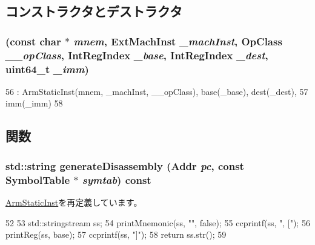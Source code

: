 \subsection{コンストラクタとデストラクタ}
\hypertarget{classArmISA_1_1SysDC64_a54b1b64752414185c38e74f5f42bd479}{
\subsubsection[{SysDC64}]{ (const char $\ast$ {\em mnem}, \/  {\bf ExtMachInst} {\em \_\-machInst}, \/  OpClass {\em \_\-\_\-opClass}, \/  {\bf IntRegIndex} {\em \_\-base}, \/  {\bf IntRegIndex} {\em \_\-dest}, \/  uint64\_\-t {\em \_\-imm})}}
\label{classArmISA_1_1SysDC64_a54b1b64752414185c38e74f5f42bd479}



\begin{DoxyCode}
56         : ArmStaticInst(mnem, _machInst, __opClass), base(_base), dest(_dest),
57         imm(_imm)
58     {}
\end{DoxyCode}


\subsection{関数}
\hypertarget{classArmISA_1_1SysDC64_a95d323a22a5f07e14d6b4c9385a91896}{
\subsubsection[{generateDisassembly}]{\setlength{\rightskip}{0pt plus 5cm}std::string generateDisassembly ({\bf Addr} {\em pc}, \/  const SymbolTable $\ast$ {\em symtab}) const}}
\label{classArmISA_1_1SysDC64_a95d323a22a5f07e14d6b4c9385a91896}


\hyperlink{classArmISA_1_1ArmStaticInst_a95d323a22a5f07e14d6b4c9385a91896}{ArmStaticInst}を再定義しています。


\begin{DoxyCode}
52 {
53     std::stringstream ss;
54     printMnemonic(ss, "", false);
55     ccprintf(ss, ", [");
56     printReg(ss, base);
57     ccprintf(ss, "]");
58     return ss.str();
59 }
\end{DoxyCode}


